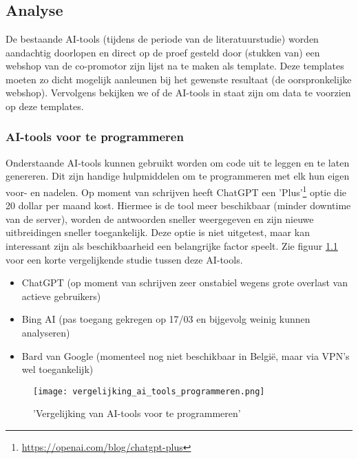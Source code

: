 
\chapter{}%
\label{ch:methodologie}


\section{Analyse}
De bestaande AI-tools (tijdens de periode van de literatuurstudie) worden aandachtig doorlopen en direct op de proef gesteld door (stukken van) een webshop van de co-promotor zijn lijst na te maken als template. Deze templates moeten zo dicht mogelijk aanleunen bij het gewenste resultaat (de oorspronkelijke webshop). Vervolgens bekijken we of de AI-tools in staat zijn om data te voorzien op deze templates.

\subsection{AI-tools voor te programmeren}
Onderstaande AI-tools kunnen gebruikt worden om code uit te leggen en te laten genereren. Dit zijn handige hulpmiddelen om te programmeren met elk hun eigen voor- en nadelen. Op moment van schrijven heeft ChatGPT een 'Plus'\footnote{\href{https://openai.com/blog/chatgpt-plus}{https://openai.com/blog/chatgpt-plus}} optie die 20 dollar per maand kost. Hiermee is de tool meer beschikbaar (minder downtime van de server), worden de antwoorden sneller weergegeven en zijn nieuwe uitbreidingen sneller toegankelijk. Deze optie is niet uitgetest, maar kan interessant zijn als beschikbaarheid een belangrijke factor speelt. Zie figuur \ref{vergelijking_ai_tools_programmeren} voor een korte vergelijkende studie tussen deze AI-tools.  
\begin{itemize}
    \item ChatGPT (op moment van schrijven zeer onstabiel wegens grote overlast van actieve gebruikers)
    \item Bing AI (pas toegang gekregen op 17/03 en bijgevolg weinig kunnen analyseren)
    \item Bard van Google (momenteel nog niet beschikbaar in België, maar via VPN's wel toegankelijk)
\end{itemize}
\begin{figure}
    \caption{'Vergelijking van AI-tools voor te programmeren'}
    \label{vergelijking_ai_tools_programmeren}
    \centering
    \texttt{[image: vergelijking\_ai\_tools\_programmeren.png]}
\end{figure}

